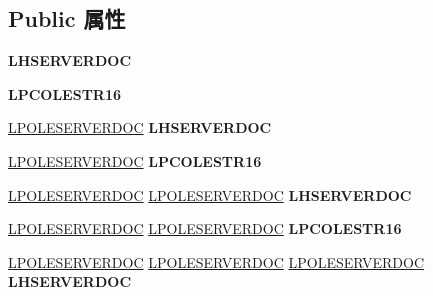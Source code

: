 \subsection*{Public 属性}
\begin{DoxyCompactItemize}
\item 
\mbox{\label{struct___o_l_e_s_e_r_v_e_r_v_t_b_l_a8de6111a58b6c62b497b31d188d2583b}} 
{\bfseries L\+H\+S\+E\+R\+V\+E\+R\+D\+OC}
\item 
\mbox{\label{struct___o_l_e_s_e_r_v_e_r_v_t_b_l_a73936006685ae612215ce3f0dadc9edd}} 
{\bfseries L\+P\+C\+O\+L\+E\+S\+T\+R16}
\item 
\mbox{\label{struct___o_l_e_s_e_r_v_e_r_v_t_b_l_a5fbd6687ad7ed7a86b339fc9ff9d8422}} 
\hyperlink{struct___o_l_e_s_e_r_v_e_r_d_o_c}{L\+P\+O\+L\+E\+S\+E\+R\+V\+E\+R\+D\+OC} {\bfseries L\+H\+S\+E\+R\+V\+E\+R\+D\+OC}
\item 
\mbox{\label{struct___o_l_e_s_e_r_v_e_r_v_t_b_l_a637a52db7deb1d9187e7f0515b14c618}} 
\hyperlink{struct___o_l_e_s_e_r_v_e_r_d_o_c}{L\+P\+O\+L\+E\+S\+E\+R\+V\+E\+R\+D\+OC} {\bfseries L\+P\+C\+O\+L\+E\+S\+T\+R16}
\item 
\mbox{\label{struct___o_l_e_s_e_r_v_e_r_v_t_b_l_a780b99b4002eefdcea5751b210f856f3}} 
\hyperlink{struct___o_l_e_s_e_r_v_e_r_d_o_c}{L\+P\+O\+L\+E\+S\+E\+R\+V\+E\+R\+D\+OC} \hyperlink{struct___o_l_e_s_e_r_v_e_r_d_o_c}{L\+P\+O\+L\+E\+S\+E\+R\+V\+E\+R\+D\+OC} {\bfseries L\+H\+S\+E\+R\+V\+E\+R\+D\+OC}
\item 
\mbox{\label{struct___o_l_e_s_e_r_v_e_r_v_t_b_l_a9e67feb27ae7cff1ac053ed9d401f6ad}} 
\hyperlink{struct___o_l_e_s_e_r_v_e_r_d_o_c}{L\+P\+O\+L\+E\+S\+E\+R\+V\+E\+R\+D\+OC} \hyperlink{struct___o_l_e_s_e_r_v_e_r_d_o_c}{L\+P\+O\+L\+E\+S\+E\+R\+V\+E\+R\+D\+OC} {\bfseries L\+P\+C\+O\+L\+E\+S\+T\+R16}
\item 
\mbox{\label{struct___o_l_e_s_e_r_v_e_r_v_t_b_l_a8de6111a58b6c62b497b31d188d2583b}} 
\hyperlink{struct___o_l_e_s_e_r_v_e_r_d_o_c}{L\+P\+O\+L\+E\+S\+E\+R\+V\+E\+R\+D\+OC} \hyperlink{struct___o_l_e_s_e_r_v_e_r_d_o_c}{L\+P\+O\+L\+E\+S\+E\+R\+V\+E\+R\+D\+OC} \hyperlink{struct___o_l_e_s_e_r_v_e_r_d_o_c}{L\+P\+O\+L\+E\+S\+E\+R\+V\+E\+R\+D\+OC} {\bfseries L\+H\+S\+E\+R\+V\+E\+R\+D\+OC}

\end{DoxyCompactItemize}
